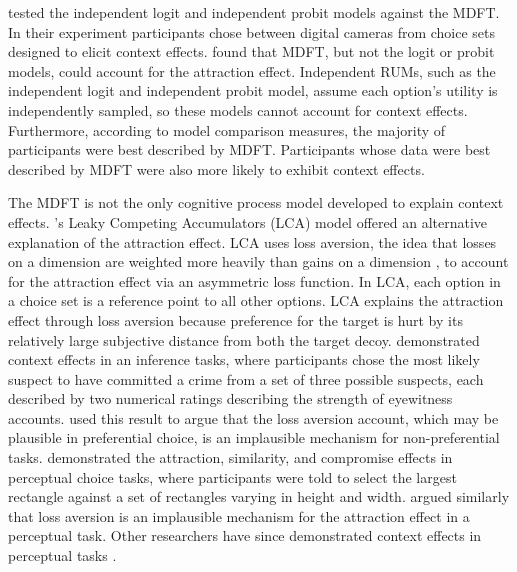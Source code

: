 \textcite{berkowitschRigorouslyTestingMultialternative2014b} tested the independent logit and independent probit models against the MDFT. In their experiment participants chose between digital cameras from choice sets designed to elicit context effects. \textcite{berkowitschRigorouslyTestingMultialternative2014b} found that MDFT, but not the logit or probit models, could account for the attraction effect. Independent RUMs, such as the independent logit and independent probit model, assume each option's utility is independently sampled, so these models cannot account for context effects. Furthermore, according to model comparison measures, the majority of participants were best described by MDFT. Participants whose data were best described by MDFT were also more likely to exhibit context effects. 

The MDFT is not the only cognitive process model developed to explain context effects. \textcite{usherLossAversionInhibition2004a}'s Leaky Competing Accumulators (LCA) model offered an alternative explanation of the attraction effect. LCA uses loss aversion, the idea that losses on a dimension are weighted more heavily than gains on a dimension \parencite{tverskyAdvancesProspectTheorya}, to account for the attraction effect via an asymmetric loss function. In LCA, each option in a choice set is a reference point to all other options. LCA explains the attraction effect through loss aversion because preference for the target is hurt by its relatively large subjective distance from both the target decoy. \textcite{truebloodMultialternativeContextEffects2012} demonstrated context effects in an inference tasks, where participants chose the most likely suspect to have committed a crime from a set of three possible suspects, each described by two numerical ratings describing the strength of eyewitness accounts. \textcite{truebloodMultialternativeContextEffects2012} used this result to argue that the loss aversion account, which may be plausible in preferential choice, is an implausible mechanism for non-preferential tasks. \textcite{trueblood2013not} demonstrated the attraction, similarity, and compromise effects in perceptual choice tasks, where participants were told to select the largest rectangle against a set of rectangles varying in height and width. \textcite{trueblood2013not} argued similarly that loss aversion is an implausible mechanism for the attraction effect in a perceptual task. Other researchers have since demonstrated context effects in perceptual tasks \parencite{choplinComparisoninducedDecoyEffects2005b,yearsleyContextEffectsSimilarity2022,liaoInfluenceDistanceDecoy2021,spektorWhenGoodLooks2018b,spektorRepulsionEffectPreferential2022}. 

